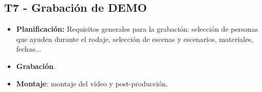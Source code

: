 \subsection{T7 - Grabación de DEMO}
\begin{itemize}
	\item \textbf{Planificación:} Requisitos generales para la grabación: selección de personas que ayuden durante
	el rodaje, selección de escenas y escenarios, materiales, fechas...

	\item \textbf{Grabación}.

	\item \textbf{Montaje}: montaje del vídeo y post-producción.
\end{itemize}
